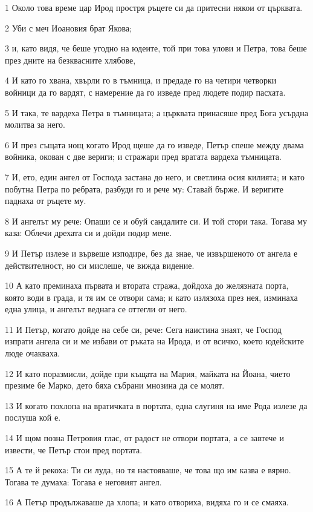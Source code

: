 \par 1 Около това време цар Ирод простря ръцете си да притесни някои от църквата.
\par 2 Уби с меч Иоановия брат Якова;
\par 3 и, като видя, че беше угодно на юдеите, той при това улови и Петра, това беше през дните на безквасните хлябове,
\par 4 И като го хвана, хвърли го в тъмница, и предаде го на четири четворки войници да го вардят, с намерение да го изведе пред людете подир пасхата.
\par 5 И така, те вардеха Петра в тъмницата; а църквата принасяше пред Бога усърдна молитва за него.
\par 6 И през същата нощ когато Ирод щеше да го изведе, Петър спеше между двама войника, окован с две вериги; и стражари пред вратата вардеха тъмницата.
\par 7 И, ето, един ангел от Господа застана до него, и светлина осия килията; и като побутна Петра по ребрата, разбуди го и рече му: Ставай бърже. И веригите паднаха от ръцете му.
\par 8 И ангелът му рече: Опаши се и обуй сандалите си. И той стори така. Тогава му каза: Облечи дрехата си и дойди подир мене.
\par 9 И Петър излезе и вървеше изподире, без да знае, че извършеното от ангела е действителност, но си мислеше, че вижда видение.
\par 10 А като преминаха първата и втората стража, дойдоха до желязната порта, която води в града, и тя им се отвори сама; и като излязоха през нея, изминаха една улица, и ангелът веднага се оттегли от него.
\par 11 И Петър, когато дойде на себе си, рече: Сега наистина знаят, че Господ изпрати ангела си и ме избави от ръката на Ирода, и от всичко, което юдейските люде очакваха.
\par 12 И като поразмисли, дойде при къщата на Мария, майката на Йоана, чието презиме бе Марко, дето бяха събрани мнозина да се молят.
\par 13 И когато похлопа на вратичката в портата, една слугиня на име Рода излезе да послуша кой е.
\par 14 И щом позна Петровия глас, от радост не отвори портата, а се завтече и извести, че Петър стои пред портата.
\par 15 А те й рекоха: Ти си луда, но тя настояваше, че това що им казва е вярно. Тогава те думаха: Тогава е неговият ангел.
\par 16 А Петър продължаваше да хлопа; и като отвориха, видяха го и се смаяха.
